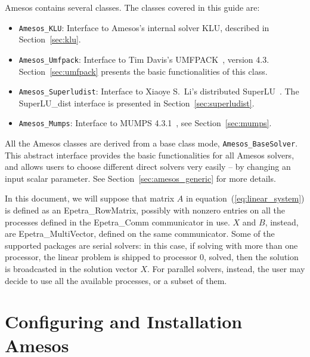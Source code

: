 \documentclass[11pt]{SANDreport}
\begin{document}
Amesos contains several classes. The classes covered in this guide are: 
\begin{itemize}
\item \verb!Amesos_KLU!: Interface to Amesos's internal solver
  KLU, described in Section~\ref{sec:klu}.
\item \verb!Amesos_Umfpack!: Interface to Tim Davis's
  UMFPACK~\cite{umfpack-home-page}, version 4.3. Section~\ref{sec:umfpack} presents the basic
  functionalities of this class.
\item \verb!Amesos_Superludist!: Interface to Xiaoye S.~Li's distributed
  SuperLU~\cite{superlu-home-page}. The SuperLU\_dist interface is
  presented in Section~\ref{sec:superludist}.
\item \verb!Amesos_Mumps!: Interface to MUMPS 4.3.1~\cite{mumps-home-page}, see
  Section~\ref{sec:mumps}.
\end{itemize}

All the Amesos classes are derived from a base class mode,
\verb!Amesos_BaseSolver!. This abstract interface provides the basic
functionalities for all Amesos solvers, and allows users to choose
different direct solvers very easily -- by changing an input scalar
parameter. See Section~\ref{sec:amesos_generic} for more details.

In this document, we will suppose that matrix $A$ in
equation~(\ref{eq:linear_system}) is defined as an Epetra\_RowMatrix,
possibly with nonzero entries on all the processes defined in the
Epetra\_Comm communicator in use. $X$ and $B$, instead, are
Epetra\_MultiVector, defined on the same communicator.  Some of the
supported packages are serial solvers: in this case, if solving with
more than one processor, the linear problem is shipped to processor 0,
solved, then the solution is broadcasted in the solution vector $X$. For
parallel solvers, instead, the user may decide to use all the available
processes, or a subset of them.



\section{Configuring and Installation Amesos}
\label{sec:3pl}
\end{document}

